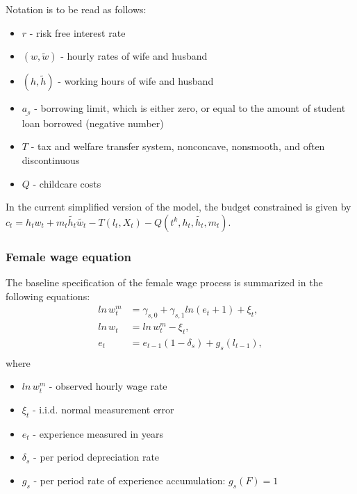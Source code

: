 \documentclass[letterpaper,10pt,english]{sphinxmanual}
\begin{document}
Notation is to be read as follows:
\begin{itemize}
\item {} 
\(r\) - risk free interest rate

\item {} 
\((w, \tilde{w})\) - hourly rates of wife and husband

\item {} 
\((h, \tilde{h})\) - working hours of wife and husband

\item {} 
\(\underline{a_s}\) - borrowing limit, which is either zero, or equal to the amount of student loan borrowed (negative number)

\item {} 
\(T\) - tax and welfare transfer system, nonconcave, nonsmooth, and often discontinuous

\item {} 
\(Q\) - childcare costs

\end{itemize}

In the current simplified version of the model, the budget constrained is given by \(c_t =  h_t w_t + m_t \tilde{h_t} \tilde{w_t} - T(l_t, X_t) - Q(t^k, h_t, \tilde{h_t}, m_t)\).


\subsubsection{Female wage equation}
\label{\detokenize{computational_model:female-wage-equation}}
The baseline specification of the female wage process is summarized in the following equations:
\begin{equation*}
\begin{split}ln \hspace{2pt} w_t^m & = \gamma_{s,0}  + \gamma_{s,1} ln(e_t + 1) + \xi_t,\\
ln \hspace{2pt} w_t & = ln \hspace{2pt} w_t^m - \xi_t,\\
e_t & = e_{t-1}(1-\delta_s) + g_s(l_{t-1}),\\\end{split}
\end{equation*}
where
\begin{itemize}
\item {} 
\(ln \hspace{2pt} w_t^m\) - observed hourly wage rate

\item {} 
\(\xi_t\) - i.i.d. normal measurement error

\item {} 
\(e_t\) - experience measured in years

\item {} 
\(\delta_s\) - per period depreciation rate

\item {} 
\(g_s\) - per period rate of experience accumulation: \(g_s(F) = 1\)

\end{itemize}
\end{document}
